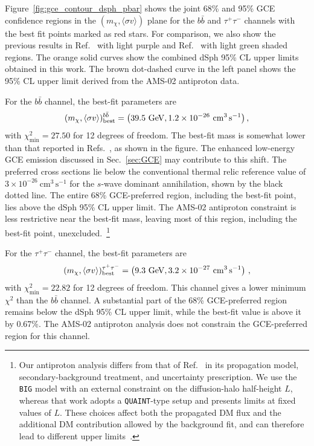 \documentclass[superscriptaddress,
showpacs,preprintnumbers,nofootinbib,eqsecnum,amsmath,amssymb,aps,11pt, groupedaddress, floatfix]{revtex4-2}
\begin{document}
Figure~\ref{fig:gce_contour_dsph_pbar} shows the joint 68\% and 95\% GCE confidence regions in the $(m_\chi, \langle\sigma v\rangle)$ plane for the $b\bar b$ and $\tau^+\tau^-$ channels with the best fit points marked as red stars.
For comparison, we also show the previous results in Ref.~\cite{Calore:2014xka} with light purple and Ref.~\cite{Cholis:2021rpp} with light green shaded regions.
The orange solid curves show the combined dSph 95\% CL upper
limits obtained in this work.
The brown dot-dashed curve in the left panel shows the
95\% CL upper limit derived from the AMS-02 antiproton data.

For the $b\bar b$ channel, the best-fit parameters are
\begin{align}
(m_\chi,\langle\sigma v\rangle)_{\rm best}^{b\bar b}
=
\left(
39.5~\mathrm{GeV},
1.2\times10^{-26}~\mathrm{cm^3\,s^{-1}}
\right),
\end{align}
with $\chi^2_{\min}=27.50$ for 12 degrees of freedom.
The best-fit mass is somewhat lower than that reported in Refs.~\cite{Calore:2014xka,Cholis:2021rpp}, as shown in the figure.
The enhanced low-energy GCE emission discussed in Sec.~\ref{sec:GCE} may
contribute to this shift.
The preferred cross sections lie below the conventional thermal relic reference value of $3\times10^{-26}~\mathrm{cm^3\,s^{-1}}$ for the $s$-wave dominant annihilation, shown by the black dotted line.
The entire 68\% GCE-preferred region, including the best-fit
point, lies above the dSph 95\% CL upper limit.
The AMS-02 antiproton constraint is less restrictive near the best-fit mass, leaving most of this region, including the best-fit point, unexcluded.~\footnote{Our antiproton analysis differs from that of Ref.~\cite{DiMauro:2021qcf} in its propagation model, secondary-background treatment, and uncertainty prescription.
We use the \texttt{BIG} model with an external constraint on
the diffusion-halo half-height $L$, whereas that work adopts
a \texttt{QUAINT}-type setup and presents limits at fixed values of $L$. These choices affect both the propagated DM flux and the additional DM contribution allowed by the background fit, and can therefore lead to different upper
limits~\cite{Heisig:2020nse, Calore:2022stf}.}

For the $\tau^+\tau^-$ channel, the best-fit parameters are
\begin{align}
(m_\chi, \langle\sigma v\rangle)_{\rm best}^{\tau^+ \tau^-}
=
\left(
9.3~\mathrm{GeV},
3.2\times10^{-27}~\mathrm{cm^3\,s^{-1}}
\right)\,,
\end{align}
with $\chi^2_{\min}=22.82$ for 12 degrees of freedom.
This channel gives a lower minimum $\chi^2$ than the $b\bar b$ channel.
A substantial part of the 68\% GCE-preferred region remains below the dSph
95\% CL upper limit, while the best-fit value is above it by 0.67\%.
The AMS-02 antiproton analysis does not constrain the GCE-preferred region for this channel.
\end{document}
